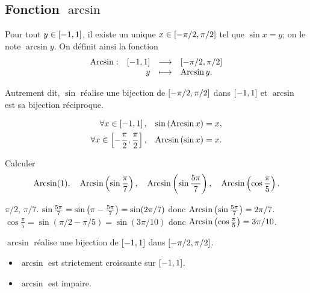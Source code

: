\documentclass{magnoliaold}
\begin{document}
\subsection{Fonction $\arcsin$}

\begin{definition}[utile=-3]
Pour tout $y\in\left[-1,1\right]$, il existe un unique $x\in\left[-\pi/2,\pi/2\right]$
tel que $\sin x=y$; on le note $\arcsin y$. On définit ainsi la fonction
\[\begin{array}[t]{lrcl} \displaystyle{\operatorname{Arcsin}} : & \displaystyle{[-1,1]} & \longrightarrow & \displaystyle{\left[-\pi/2,\pi/2\right]} \\ & \displaystyle{y} & \longmapsto & \displaystyle{\operatorname{Arcsin}y .} \end{array}\]
\end{definition}

\begin{remarqueUnique}
\remarque Autrement dit, $\sin$ réalise une bijection de $\left[-\pi/2,\pi/2\right]$ dans $\left[-1,1\right]$ et $\arcsin$ est sa bijection réciproque.
\end{remarqueUnique}

\begin{proposition}[utile=-3]
\begin{eqnarray*}
\forall x\in\left[-1,1\right], & & \sin\left(\operatorname{Arcsin} x\right)=x,\\
\forall x\in\left[-\frac{\pi}{2},\frac{\pi}{2}\right], & &
  \operatorname{Arcsin}\left(\sin x\right)=x .    
\end{eqnarray*}
\end{proposition}

\begin{exoUnique}
\exemple Calculer
  \[\operatorname{Arcsin}(1), \quad \operatorname{Arcsin}\left(\sin\frac{\pi}{7}\right), \quad
    \operatorname{Arcsin}\left(\sin\frac{5\pi}{7}\right), \quad \operatorname{Arcsin}\left(\cos\frac{\pi}{5}\right).\]
\end{exoUnique}

\begin{sol}
$\pi/2$, $\pi/7$.
$\sin\frac{5\pi}{7}=\sin\left(\pi-\frac{5\pi}{7}\right)=\sin(2\pi/7)$ donc $\operatorname{Arcsin}\left(\sin\frac{5\pi}{7}\right)=2\pi/7$.
$\cos\frac{\pi}{5}=\sin(\pi/2-\pi/5)=\sin(3\pi/10)$ donc $\operatorname{Arcsin}\left(\cos\frac{\pi}{5}\right)=3\pi/10$.


\end{sol}

\begin{proposition}[utile=-3]
$\arcsin$ réalise une bijection de $\left[-1,1\right]$ dans $\left[-\pi/2,\pi/2\right]$.
\end{proposition}

\begin{proposition}[utile=-3]
\begin{itemize}
\item $\arcsin$ est strictement croissante sur $\left[-1,1\right]$.
\item $\arcsin$ est impaire.
\end{itemize}
\end{proposition}
\end{document}
